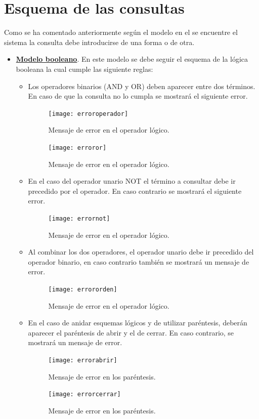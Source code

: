 \documentclass[size=a4, parskip=half, titlepage=false, toc=flat, toc=bib, 12pt, twoside]{scrartcl}
\theoremstyle{theorem-style}
\theoremstyle{definition-style}
\theoremstyle{remark-style}
\theoremstyle{example-style}
\theoremstyle{definition-style}
\theoremstyle{remark-style}
\begin{document}
\newpage

\section{Esquema de las consultas}
Como se ha comentado anteriormente según el modelo en el se encuentre el sistema la consulta debe introducirse de una forma o de otra.
\begin{itemize}
\item \textbf{\underline{Modelo booleano}}. En este modelo se debe seguir el esquema de la lógica booleana la cual cumple las siguiente reglas:
\begin{itemize}
\item Los operadores binarios (AND y OR) deben aparecer entre dos términos. En caso de que la consulta no lo cumpla se mostrará el siguiente error.
\begin{figure}[H]
\centering
\texttt{[image: erroroperador]}
\caption{Mensaje de error en el operador lógico.}
\end{figure}
\begin{figure}[H]
\centering
\texttt{[image: erroror]}
\caption{Mensaje de error en el operador lógico.}
\end{figure}
\item En el caso del operador unario NOT el término a consultar debe ir precedido por el operador. En caso contrario se mostrará el siguiente error.
\begin{figure}[H]
\centering
\texttt{[image: errornot]}
\caption{Mensaje de error en el operador lógico.}
\end{figure}
\item Al combinar los dos operadores, el operador unario debe ir precedido del operador binario, en caso contrario también se mostrará un mensaje de error.
\begin{figure}[H]
\centering
\texttt{[image: errororden]}
\caption{Mensaje de error en el operador lógico.}
\end{figure}
\item En el caso de anidar esquemas lógicos y de utilizar paréntesis, deberán aparecer el paréntesis de abrir y el de cerrar. En caso contrario, se mostrará un mensaje de error.
\begin{figure}[H]
\centering
\texttt{[image: errorabrir]}
\caption{Mensaje de error en los paréntesis.}
\end{figure}
\begin{figure}[H]
\centering
\texttt{[image: errorcerrar]}
\caption{Mensaje de error en los paréntesis.}

\end{figure}
\end{itemize}
\end{itemize}
\end{document}
